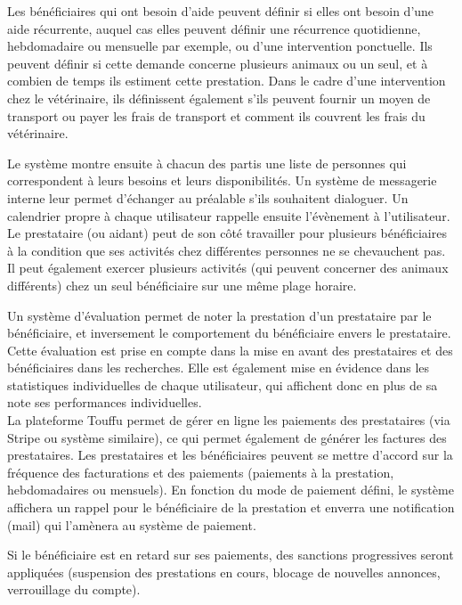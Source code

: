 \documentclass[conference]{IEEEtran}
\begin{document}
Les bénéficiaires qui ont besoin d'aide peuvent définir si elles ont besoin d'une aide récurrente, auquel cas elles peuvent définir une récurrence quotidienne, hebdomadaire ou mensuelle par exemple, ou d'une intervention ponctuelle. Ils peuvent définir si cette demande concerne plusieurs animaux ou un seul, et à combien de temps ils estiment cette prestation. Dans le cadre d'une intervention chez le vétérinaire, ils définissent également s'ils peuvent fournir un moyen de transport ou payer les frais de transport et comment ils couvrent les frais du vétérinaire.

Le système montre ensuite à chacun des partis une liste de personnes qui correspondent à leurs besoins et leurs disponibilités. Un système de messagerie interne leur permet d'échanger au préalable s'ils souhaitent dialoguer. Un calendrier propre à chaque utilisateur rappelle ensuite l'évènement à l'utilisateur.\\

Le prestataire (ou aidant) peut de son côté travailler pour plusieurs bénéficiaires à la condition que ses activités chez différentes personnes ne se chevauchent pas. Il peut également exercer plusieurs activités (qui peuvent concerner des animaux différents) chez un seul bénéficiaire sur une même plage horaire.

Un système d'évaluation permet de noter la prestation d'un prestataire par le bénéficiaire, et inversement le comportement du bénéficiaire envers le prestataire. Cette évaluation est prise en compte dans la mise en avant des prestataires et des bénéficiaires dans les recherches. Elle est également mise en évidence dans les statistiques individuelles de chaque utilisateur, qui affichent donc en plus de sa note ses performances individuelles.\\

La plateforme Touffu permet de gérer en ligne les paiements des prestataires (via Stripe ou système similaire), ce qui permet également de générer les factures des prestataires. Les prestataires et les bénéficiaires peuvent se mettre d'accord sur la fréquence des facturations et des paiements (paiements à la prestation, hebdomadaires ou mensuels). En fonction du mode de paiement défini, le système affichera un rappel pour le bénéficiaire de la prestation et enverra une notification (mail) qui l'amènera au système de paiement.

Si le bénéficiaire est en retard sur ses paiements, des sanctions progressives seront appliquées (suspension des prestations en cours, blocage de nouvelles annonces, verrouillage du compte).
\\
\end{document}
